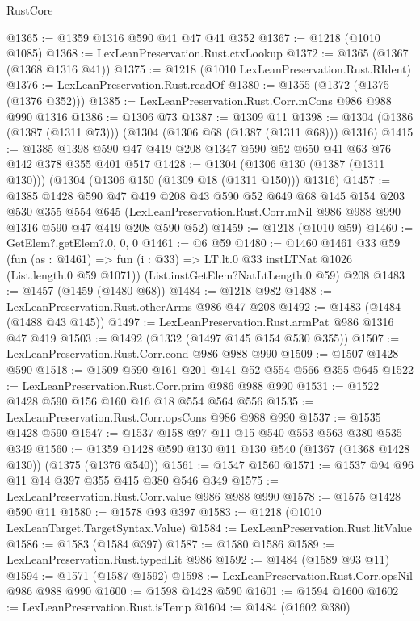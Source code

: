 \begin{lexlean}{RustCore}
\begin{coremodule}
@1365 := @1359 @1316 @590 @41 @47 @41 @352
@1367 := @1218 (@1010 @1085)
@1368 := LexLeanPreservation.Rust.ctxLookup
@1372 := @1365 (@1367 (@1368 @1316 @41))
@1375 := @1218 (@1010 LexLeanPreservation.Rust.RIdent)
@1376 := LexLeanPreservation.Rust.readOf
@1380 := @1355 (@1372 (@1375 (@1376 @352)))
@1385 := LexLeanPreservation.Rust.Corr.mCons @986 @988 @990 @1316
@1386 := @1306 @73
@1387 := @1309 @11
@1398 := @1304 (@1386 (@1387 (@1311 @73))) (@1304 (@1306 @68 (@1387 (@1311 @68))) @1316)
@1415 := @1385 @1398 @590 @47 @419 @208 @1347 @590 @52 @650 @41 @63 @76 @142 @378 @355 @401 @517
@1428 := @1304 (@1306 @130 (@1387 (@1311 @130))) (@1304 (@1306 @150 (@1309 @18 (@1311 @150))) @1316)
@1457 := @1385
    @1428
    @590
    @47
    @419
    @208
    @43
    @590
    @52
    @649
    @68
    @145
    @154
    @203
    @530
    @355
    @554
    @645
    (LexLeanPreservation.Rust.Corr.mNil @986 @988 @990 @1316 @590 @47 @419 @208 @590 @52)
@1459 := @1218 (@1010 @59)
@1460 := GetElem?.getElem?.{0, 0, 0}
@1461 := @6 @59
@1480 := @1460
    @1461
    @33
    @59
    (fun (as : @1461) => fun (i : @33) => LT.lt.{0} @33 instLTNat @1026 (List.length.{0} @59 @1071))
    (List.instGetElem?NatLtLength.{0} @59)
    @208
@1483 := @1457 (@1459 (@1480 @68))
@1484 := @1218 @982
@1488 := LexLeanPreservation.Rust.otherArms @986 @47 @208
@1492 := @1483 (@1484 (@1488 @43 @145))
@1497 := LexLeanPreservation.Rust.armPat @986 @1316 @47 @419
@1503 := @1492 (@1332 (@1497 @145 @154 @530 @355))
@1507 := LexLeanPreservation.Rust.Corr.cond @986 @988 @990
@1509 := @1507 @1428 @590
@1518 := @1509 @590 @161 @201 @141 @52 @554 @566 @355 @645
@1522 := LexLeanPreservation.Rust.Corr.prim @986 @988 @990
@1531 := @1522 @1428 @590 @156 @160 @16 @18 @554 @564 @556
@1535 := LexLeanPreservation.Rust.Corr.opsCons @986 @988 @990
@1537 := @1535 @1428 @590
@1547 := @1537 @158 @97 @11 @15 @540 @553 @563 @380 @535 @349
@1560 := @1359 @1428 @590 @130 @11 @130 @540 (@1367 (@1368 @1428 @130)) (@1375 (@1376 @540))
@1561 := @1547 @1560
@1571 := @1537 @94 @96 @11 @14 @397 @355 @415 @380 @546 @349
@1575 := LexLeanPreservation.Rust.Corr.value @986 @988 @990
@1578 := @1575 @1428 @590 @11
@1580 := @1578 @93 @397
@1583 := @1218 (@1010 LexLeanTarget.TargetSyntax.Value)
@1584 := LexLeanPreservation.Rust.litValue
@1586 := @1583 (@1584 @397)
@1587 := @1580 @1586
@1589 := LexLeanPreservation.Rust.typedLit @986
@1592 := @1484 (@1589 @93 @11)
@1594 := @1571 (@1587 @1592)
@1598 := LexLeanPreservation.Rust.Corr.opsNil @986 @988 @990
@1600 := @1598 @1428 @590
@1601 := @1594 @1600
@1602 := LexLeanPreservation.Rust.isTemp
@1604 := @1484 (@1602 @380)

\end{coremodule}
\end{lexlean}
